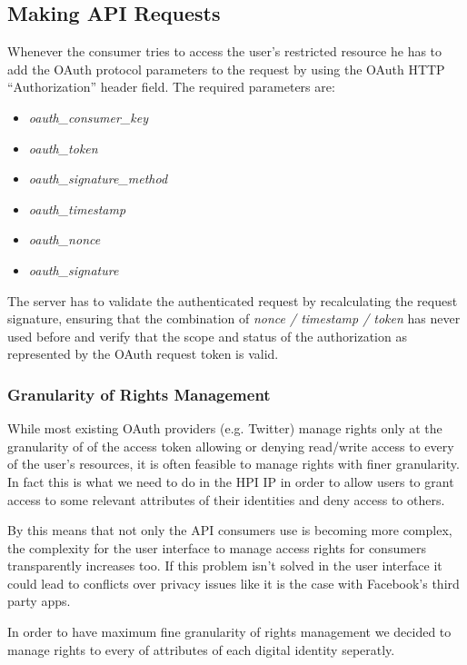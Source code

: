 \subsection{Making API Requests}

Whenever the consumer tries to access the user's restricted
resource he has to add the OAuth protocol parameters to the request
by using the OAuth HTTP ``Authorization'' header field. The
required parameters are:

\begin{itemize}
\item
  \emph{oauth\_consumer\_key}
\item
  \emph{oauth\_token}
\item
  \emph{oauth\_signature\_method}
\item
  \emph{oauth\_timestamp}
\item
  \emph{oauth\_nonce}
\item
  \emph{oauth\_signature}
\end{itemize}
The server has to validate the authenticated request by
recalculating the request signature, ensuring that the combination
of \emph{nonce / timestamp / token} has never used before and
verify that the scope and status of the authorization as
represented by the OAuth request token is valid.

\subsubsection{Granularity of Rights Management}

While most existing OAuth providers (e.g. Twitter) manage rights
only at the granularity of of the access token allowing or denying
read/write access to every of the user's resources, it is often
feasible to manage rights with finer granularity. In fact this is
what we need to do in the HPI IP in order to allow users to grant
access to some relevant attributes of their identities and deny
access to others.

By this means that not only the API consumers use is becoming more
complex, the complexity for the user interface to manage access
rights for consumers transparently increases too. If this problem
isn't solved in the user interface it could lead to conflicts over
privacy issues like it is the case with Facebook's third party
apps.

In order to have maximum fine granularity of rights management we
decided to manage rights to every of attributes of each digital
identity seperatly.

